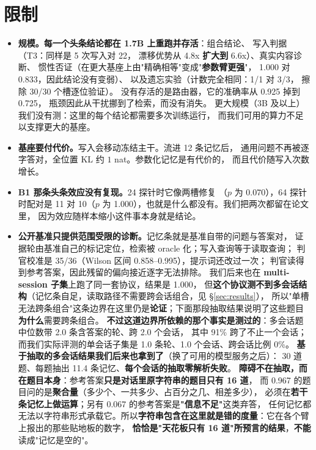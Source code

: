\documentclass[11pt]{ctexart}
\begin{document}
\section{限制}
\label{sec:limits}
\begin{itemize}\setlength\itemsep{2pt}
\item \textbf{规模。}\textbf{每一个头条结论都在 1.7B 上重跑并存活}：组合结论、
写入判据（T3：同样是 5 次写入对 22，
漂移优势从 4.8x \textbf{扩大到} 6.6x）、真实内容诊断、
惯性否证（在更大基座上由"精确相等"变成"\textbf{参数臂更强}"，
1.000 对 0.833，因此结论没有变弱）、
以及遗忘实验（计数完全相同：1/1 对 3/3，
擦除 30/30 个槽逐位验证）。
没有存活的是路由器，它的准确率从 0.925 掉到 0.725，
瓶颈因此从干扰挪到了检索，而没有消失。
更大规模（3B 及以上）我们没有测：这里的每个结论都需要多次训练运行，
而我们可用的算力不足以支撑更大的基座。
\item \textbf{基座要付代价。}写入会移动冻结主干。流进 12 条记忆后，
通用问题不再被逐字答对，全位置 KL 约 $1$ nat。参数化记忆是有代价的，
而且代价随写入次数增长。
\item \textbf{B1 那条头条效应没有复现。}24 探针时它像两槽修复
（$p$ 为 0.070），64 探针时配对是 11
对 10（$p$ 为 1.000），也就是什么都没有。我们把两次都留在论文里，
因为效应随样本缩小这件事本身就是结论。
\item \textbf{公开基准只提供范围受限的诊断。}记忆条就是基准自带的问题与答案对，
证据轮由基准自己的标记定位，检索被 oracle 化；写入查询等于读取查询；
判官校准是 35/36（Wilson 区间
0.858–0.995），提示词还改过一次；
判官读得到参考答案，因此残留的偏向接近逐字无法排除。
我们后来也在 \textbf{multi-session 子集}上跑了同一套协议，结果是 1.000，
但\textbf{这个协议测不到多会话结构}（记忆条自足，读取路径不需要跨会话组合，见 §\ref{sec:results}），
所以"单槽无法跨条组合"这条边界在这里仍是\textbf{论证}；下面那段抽取结果说明了这些题目\textbf{为什么}需要跨条组合。
\textbf{不过这道边界所依赖的那个事实是测过的}：多会话题中位数带
2.0 条含答案的轮、跨 2.0 个会话，
其中 91\% 跨了不止一个会话；而我们实际评测的单会话子集是
1.0 条轮、1.0 个会话、跨会话比例 0\%。
\textbf{基于抽取的多会话结果我们后来也拿到了}（换了可用的模型服务之后）：
30 道题、每题抽出 11.4 条记忆、\textbf{每个会话的抽取零解析失败}。
\textbf{障碍不在抽取，而在题目本身}：参考答案\textbf{只是对话里原字符串的题目只有 16 道}，
而 0.967 的题目问的是\textbf{聚合量}（多少个、一共多少、占百分之几、相差多少），
必须在\textbf{若干条记忆上做运算}；另有 0.067 的参考答案是\textbf{"信息不足"}这类弃答，
任何记忆都无法以字符串形式承载它。所以\textbf{字符串包含在这里就是错的度量}：它在各个臂上报出的那些贴地板的数字，
\textbf{恰恰是"天花板只有 16 道"所预言的结果}，\textbf{不能}读成"记忆是空的"。


\end{itemize}
\end{document}
